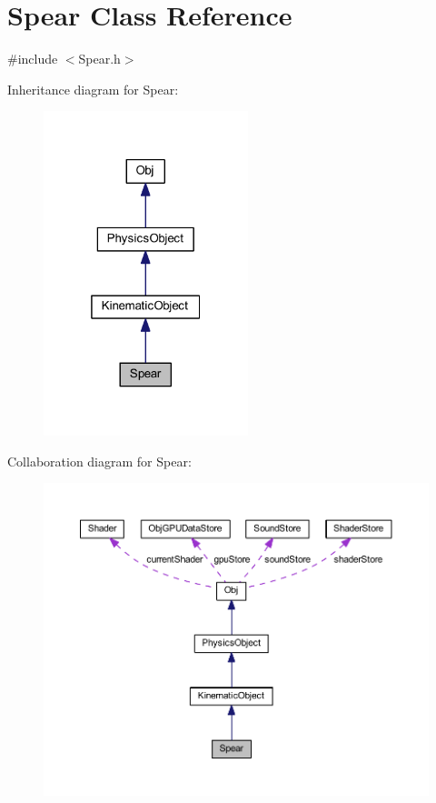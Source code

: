 \hypertarget{class_spear}{}\section{Spear Class Reference}
\label{class_spear}


{\ttfamily \#include $<$Spear.\+h$>$}



Inheritance diagram for Spear\+:
\nopagebreak
\begin{figure}[H]
\begin{center}
\leavevmode
\includegraphics[width=169pt]{class_spear__inherit__graph}
\end{center}
\end{figure}


Collaboration diagram for Spear\+:
\nopagebreak
\begin{figure}[H]
\begin{center}
\leavevmode
\includegraphics[width=350pt]{class_spear__coll__graph}
\end{center}
\end{figure}
